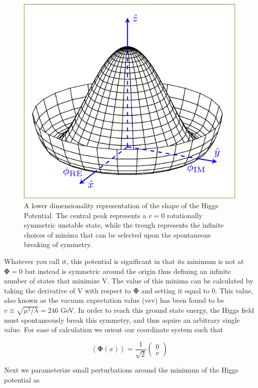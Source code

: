 \begin{figure}[!htb]
  \begin{center}
    \includegraphics[width=0.6\linewidth]{figures/theory/higgs_potential.png}
    \caption{ A lower dimensionality representation of the shape of the Higgs
Potential.  The central peak represents a $v = 0$ rotationally symmetric
unstable state, while the trough represents the infinite choices of minima that
can be selected upon the spontaneous breaking of symmetry.}
    \label{fig:higgs_potential}
  \end{center}
\end{figure}

Whatever you call it, this potential is significant in
that its minimum is not at $\boldsymbol{\Phi} = 0$ but instead is symmetric
around the origin thus defining an infinite number of states that minimize V.
The value of this minima can be calculated by taking the derivative of V with
respect to $\boldsymbol{\Phi}$ and setting it equal to $0$. This value, also
known as the vacuum expectation value (vev) has been found to be $v \equiv
\sqrt{\mu^{2}/\lambda} = 246$ GeV. In order to reach this ground state energy,
the Higgs field must spontaneously break this symmetry, and thus aquire an
arbitrary single value.  For ease of calculation we orient our coordinate system
such that

\begin{equation}
\left\langle \boldsymbol{\Phi}(x) \right\rangle = \frac{1}{\sqrt{2}} \left(
\begin{matrix} 0 \\ v \end{matrix} \right)
\end{equation} 

Next we parameterize small perturbations around the minimum of the Higgs
potential as 

